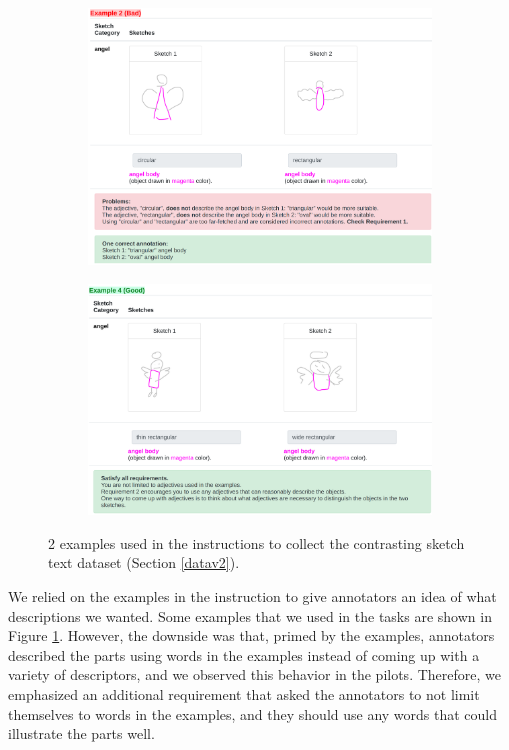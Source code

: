 \begin{figure}[!h]
\begin{subfigure}{\textwidth}
  \centering
  \includegraphics[width=0.8\linewidth]{data_collection/version2/v2example2.png}  
\end{subfigure}
\newline
\vspace{5mm}
\begin{subfigure}{\textwidth}
  \centering
  \includegraphics[width=0.8\linewidth]{data_collection/version2/v2example1.png}  
\end{subfigure}
\caption{2 examples used in the instructions to collect the contrasting sketch text dataset (Section \ref{datav2}).}
\label{v2.examples}
\end{figure}

We relied on the examples in the instruction to give annotators an idea of what descriptions we wanted. 
Some examples that we used in the tasks are shown in Figure \ref{v2.examples}.
However, the downside was that, primed by the examples, annotators described the parts using words in the examples instead of coming up with a variety of descriptors, and we observed this behavior in the pilots. 
Therefore, we emphasized an additional requirement that asked the annotators to not limit themselves to words in the examples, and they should use any words that could illustrate the parts well. 

